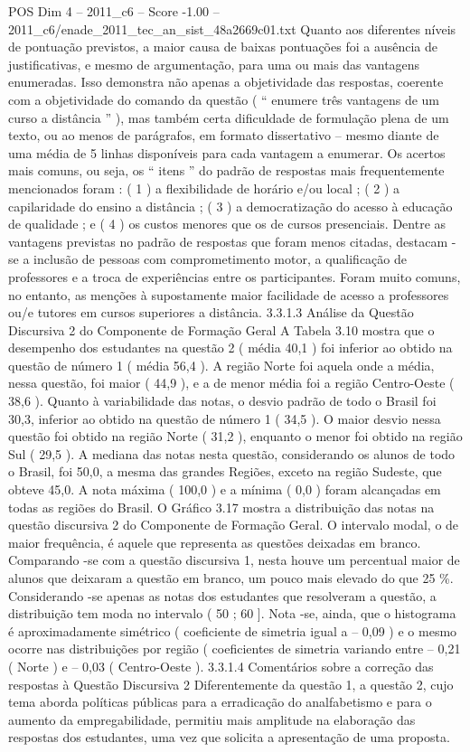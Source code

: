 \begin{textsample}{POS Dim 4 – 2011\_c6 – Score -1.00 – 2011\_c6/enade\_2011\_tec\_an\_sist\_48a2669c01.txt}
Quanto aos diferentes níveis de pontuação previstos, a maior causa de baixas pontuações foi a ausência de justificativas, e mesmo de argumentação, para uma ou mais das vantagens enumeradas.
Isso demonstra não apenas a objetividade das respostas, coerente com a objetividade do comando da questão ( “ enumere três vantagens de um curso a distância ” ), mas também certa dificuldade de formulação plena de um texto, ou ao menos de parágrafos, em formato dissertativo – mesmo diante de uma média de 5 linhas disponíveis para cada vantagem a enumerar.
Os acertos mais comuns, ou seja, os “ itens ” do padrão de respostas mais frequentemente mencionados foram : ( 1 ) a flexibilidade de horário e/ou local ; ( 2 ) a capilaridade do ensino a distância ; ( 3 ) a democratização do acesso à educação de qualidade ; e ( 4 ) os custos menores que os de cursos presenciais.
Dentre as vantagens previstas no padrão de respostas que foram menos citadas, destacam -se a inclusão de pessoas com comprometimento motor, a qualificação de professores e a troca de experiências entre os participantes.
Foram muito comuns, no entanto, as menções à supostamente maior facilidade de acesso a professores ou/e tutores em cursos superiores a distância. 3.3.1.3 Análise da Questão Discursiva 2 do Componente de Formação Geral A Tabela 3.10 mostra que o desempenho dos estudantes na questão 2 ( média 40,1 ) foi inferior ao obtido na questão de número 1 ( média 56,4 ).
A região Norte foi aquela onde a média, nessa questão, foi maior ( 44,9 ), e a de menor média foi a região Centro-Oeste ( 38,6 ).
Quanto à variabilidade das notas, o desvio padrão de todo o Brasil foi 30,3, inferior ao obtido na questão de número 1 ( 34,5 ).
O maior desvio nessa questão foi obtido na região Norte ( 31,2 ), enquanto o menor foi obtido na região Sul ( 29,5 ).
A mediana das notas nesta questão, considerando os alunos de todo o Brasil, foi 50,0, a mesma das grandes Regiões, exceto na região Sudeste, que obteve 45,0.
A nota máxima ( 100,0 ) e a mínima ( 0,0 ) foram alcançadas em todas as regiões do Brasil.
O Gráfico 3.17 mostra a distribuição das notas na questão discursiva 2 do Componente de Formação Geral.
O intervalo modal, o de maior frequência, é aquele que representa as questões deixadas em branco.
Comparando -se com a questão discursiva 1, nesta houve um percentual maior de alunos que deixaram a questão em branco, um pouco mais elevado do que 25 \%.
Considerando -se apenas as notas dos estudantes que resolveram a questão, a distribuição tem moda no intervalo ( 50 ; 60 ].
Nota -se, ainda, que o histograma é aproximadamente simétrico ( coeficiente de simetria igual a – 0,09 ) e o mesmo ocorre nas distribuições por região ( coeficientes de simetria variando entre – 0,21 ( Norte ) e – 0,03 ( Centro-Oeste ). 3.3.1.4 Comentários sobre a correção das respostas à Questão Discursiva 2 Diferentemente da questão 1, a questão 2, cujo tema aborda políticas públicas para a erradicação do analfabetismo e para o aumento da empregabilidade, permitiu mais amplitude na elaboração das respostas dos estudantes, uma vez que solicita a apresentação de uma proposta.

\end{textsample}
